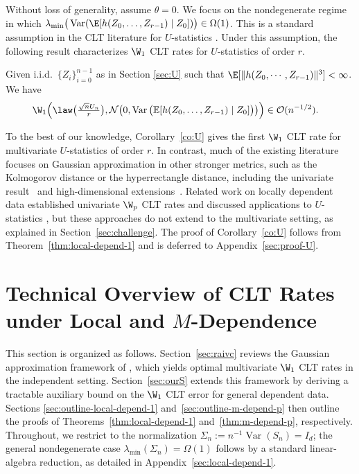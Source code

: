 \documentclass[mnsc,nonblindrev]{informs3}
\begin{document}
Without loss of generality, assume $\theta=0$. We focus on the nondegenerate regime in which $\lambda_{\min}\big(\operatorname{Var}(\E[h(Z_0,\dots,Z_{r-1}) \mid Z_0])\big) \in \Omega(1)$. This is a standard assumption in the CLT literature for \(U\)-statistics
\citep{callaert1978berry,gotze1987approximations,chen2018gaussian}.  Under this assumption,
the following result characterizes $\W_1$ CLT rates for $U$-statistics of order $r$.
\begin{corollary}\label{co:U}
Given i.i.d.\ $\{Z_i\}_{i=0}^{n-1}$ as in Section \ref{sec:U} such that $\E[\|h(Z_0, \cdots, Z_{r-1})\|^3]<\infty$. We have
\begin{align*}
&\W_1\Big(\law\big(\tfrac{\sqrt{n}U_n}{r}\big), \mathcal N\big(0, \operatorname{Var}\big(\mathbb{E}[h(Z_0,\ldots,Z_{r-1}) \mid Z_0]\big)\big)\Big) \in \mathcal O (n^{-1/2}).
\end{align*}
\end{corollary}
To the best of our knowledge, Corollary~\ref{co:U} gives the first
\(\W_1\) CLT rate for multivariate \(U\)-statistics of order \(r\).  In contrast, much of the existing literature
focuses on Gaussian approximation in other stronger metrics, such as the
Kolmogorov distance or the hyperrectangle distance, including the univariate
result~\citep{callaert1978berry} and high-dimensional extensions~\citep{gotze1987approximations,chen2018gaussian}.
 Related work on locally dependent data
established univariate $\W_p$ CLT rates and discussed applications to $U$-statistics
\citep{liu2023wasserstein,fang2019wasserstein}, but these approaches do not extend 
to the multivariate setting, as explained in Section~\ref{sec:challenge}. The proof of Corollary~\ref{co:U} follows from Theorem~\ref{thm:local-depend-1} and is
deferred to Appendix~\ref{sec:proof-U}.


\section{Technical Overview of CLT Rates under Local and 
$M$-Dependence}\label{sec:outline-local}
This section is organized as follows. Section~\ref{sec:raivc} reviews the Gaussian
approximation framework of \cite{raivc2018multivariate}, which yields optimal multivariate
$\W_1$ CLT rates in the independent setting. Section~\ref{sec:ourS} extends this framework by deriving a tractable auxiliary bound on the
$\W_1$ CLT error for general dependent data.
 Sections
\ref{sec:outline-local-depend-1} and~\ref{sec:outline-m-depend-p} then outline the proofs of
Theorems~\ref{thm:local-depend-1} and~\ref{thm:m-depend-p}, respectively. Throughout, we
restrict to the normalization $\Sigma_n:=n^{-1}\operatorname{Var}(S_n)=I_d$; the general nondegenerate
case $\lambda_{\min}(\Sigma_n)=\Omega(1)$ follows by a standard linear-algebra reduction,
as detailed in Appendix~\ref{sec:local-depend-1}.
\end{document}
